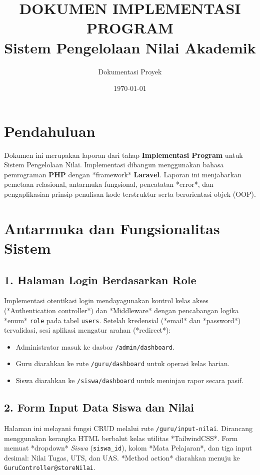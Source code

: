 \documentclass[12pt, a4paper]{article}
\title{\textbf{DOKUMEN IMPLEMENTASI PROGRAM\\ Sistem Pengelolaan Nilai Akademik}}
\author{Dokumentasi Proyek}
\date{\today}
\begin{document}
\maketitle
\tableofcontents
\newpage

\section{Pendahuluan}
Dokumen ini merupakan laporan dari tahap \textbf{Implementasi Program} untuk Sistem Pengelolaan Nilai. Implementasi dibangun menggunakan bahasa pemrograman \textbf{PHP} dengan *framework* \textbf{Laravel}. Laporan ini menjabarkan pemetaan relasional, antarmuka fungsional, pencatatan *error*, dan pengaplikasian prinsip penulisan kode terstruktur serta berorientasi objek (OOP).

\section{Antarmuka dan Fungsionalitas Sistem}

\subsection{1. Halaman Login Berdasarkan Role}
Implementasi otentikasi login mendayagunakan kontrol kelas akses (*Authentication controller*) dan *Middleware* dengan pencabangan logika *enum* \texttt{role} pada tabel \texttt{users}. Setelah kredensial (*email* dan *password*) tervalidasi, sesi aplikasi mengatur arahan (*redirect*):
\begin{itemize}
    \item Administrator masuk ke dasbor \texttt{/admin/dashboard}.
    \item Guru diarahkan ke rute \texttt{/guru/dashboard} untuk operasi kelas harian.
    \item Siswa diarahkan ke \texttt{/siswa/dashboard} untuk meninjau rapor secara pasif.
\end{itemize}

\subsection{2. Form Input Data Siswa dan Nilai}
Halaman ini melayani fungsi CRUD melalui rute \texttt{/guru/input-nilai}. Dirancang menggunakan kerangka HTML berbalut kelas utilitas *TailwindCSS*. Form memuat *dropdown* \textit{Siswa} (\texttt{siswa\_id}), kolom *Mata Pelajaran*, dan tiga input desimal: Nilai Tugas, UTS, dan UAS. *Method action* diarahkan menuju ke \texttt{GuruController@storeNilai}.
\end{document}
